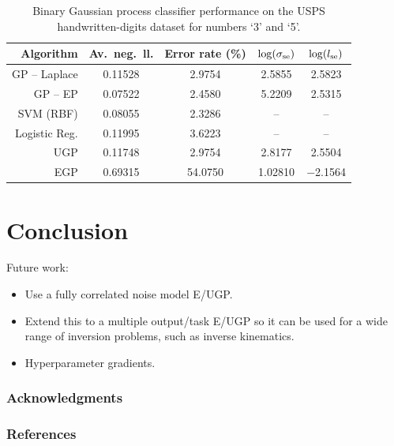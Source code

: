 \documentclass{article} %
\begin{document}
\begin{table}[htb]
    \centering
    \small
    \caption[]{Binary Gaussian process classifier performance on the USPS
        handwritten-digits dataset for numbers `3' and `5'.}
    \begin{tabular}{r| c c c c}
        Algorithm & Av.\ neg.\ ll. & Error rate (\%) 
            & $\log\!\left({\sigma_\text{se}}\right)$ & $\log\!\left({l_\text{se}}\right)$ \\
        \toprule
        GP -- Laplace & 0.11528 & 2.9754 & 2.5855 & 2.5823 \\
        GP -- EP & 0.07522 & 2.4580 & 5.2209 & 2.5315 \\
        SVM (RBF) & 0.08055 & 2.3286 & -- & -- \\
        Logistic Reg. & 0.11995 & 3.6223 & -- & -- \\
        \midrule
        UGP & 0.11748 & 2.9754 &  2.8177 & 2.5504 \\
        EGP & 0.69315 & 54.0750 & 1.02810 & $-$2.1564 \\
        \bottomrule
    \end{tabular}
\end{table}

\section{Conclusion}

Future work:
\begin{itemize}
    \item Use a fully correlated noise model E/UGP.
    \item Extend this to a multiple output/task E/UGP so it can be used for a
        wide range of inversion problems, such as inverse kinematics.
    \item Hyperparameter gradients.
\end{itemize}

\subsubsection*{Acknowledgments}

\subsubsection*{References}
\printbibliography
\end{document}
